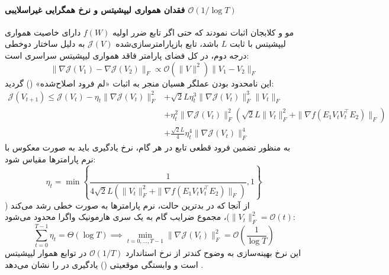 \paragraph*{فقدان همواری لیپشیتس و نرخ همگرایی غیراسلایبی $\mathcal{O}(1/\log T)$}
مو و کلابجان \cite{mu2026convergence} اثبات نمودند که حتی اگر تابع ضرر اولیه $f(W)$ دارای خاصیت همواری لیپشیتس با ثابت $L$ باشد، تابع بازپارامترسازی‌شده $\mathcal{J}(V)$ به دلیل ساختار دوخطی درجه دوم، در کل فضای پارامتر فاقد همواری لیپشیتس سراسری است:
\begin{equation}
    \|\nabla \mathcal{J}(V_1) - \nabla \mathcal{J}(V_2)\|_F \propto \mathcal{O}(\|V\|^2) \|V_1 - V_2\|_F
\end{equation}
این نامحدود بودن عملگر هسیان منجر به اثبات «لم فرود اصلاح‌شده» () گردید:
\begin{equation}
\begin{split}
    \mathcal{J}(V_{t+1}) \le \mathcal{J}(V_t) - \eta_t \|\nabla \mathcal{J}(V_t)\|_F^2 &+ \sqrt{2}L\eta_t^3 \|\nabla \mathcal{J}(V_t)\|_F^3 \|V_t\|_F \\
    &+ \eta_t^2 \|\nabla \mathcal{J}(V_t)\|_F^2 \left(\sqrt{2}L\|V_t\|_F^2 + \|\nabla f(E_1 V_t V_t^\top E_2)\|_F\right) \\
    &+ \frac{\sqrt{2}L}{4} \eta_t^4 \|\nabla \mathcal{J}(V_t)\|_F^4
\end{split}
\end{equation}
به منظور تضمین فرود قطعی تابع در هر گام، نرخ یادگیری باید به صورت معکوس با نرم پارامترها مقیاس شود:
\begin{equation}
    \eta_t = \min\left\{ \frac{1}{4\sqrt{2}L \left( \|V_t\|_F^2 + \|\nabla f(E_1 V_t V_t^\top E_2)\|_F \right)}, 1 \right\}
\end{equation}
از آنجا که در بدترین حالت، نرم پارامترها به صورت خطی رشد می‌کند ($\|V_t\|_F^2 = \mathcal{O}(t)$)، مجموع ضرایب گام به یک سری هارمونیک واگرا محدود می‌شود:
\begin{equation}
    \sum_{t=0}^{T-1} \eta_t = \Theta(\log T) \implies \min_{t=0,\dots,T-1} \|\nabla \mathcal{J}(V_t)\|_F^2 = \mathcal{O}\left(\frac{1}{\log T}\right)
\end{equation}
این نرخ بهینه‌سازی به وضوح کندتر از نرخ استاندارد $\mathcal{O}(1/T)$ در توابع هموار لیپشیتس است و وابستگی موقعیتی () یادگیری در  را نشان می‌دهد \cite{mu2026convergence}.


